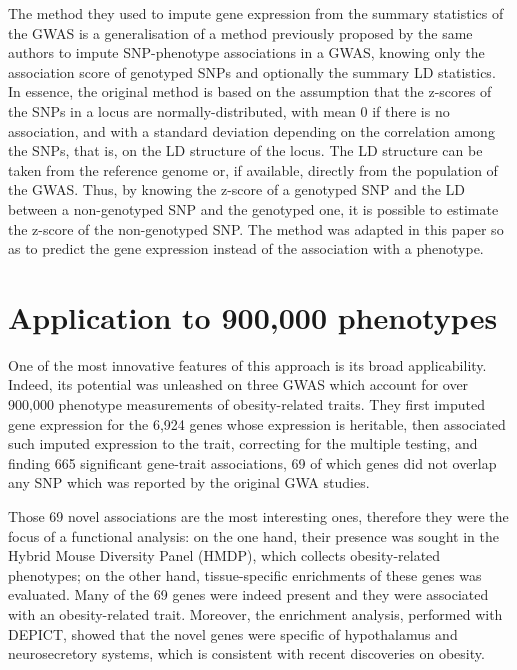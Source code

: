 \documentclass[../main.tex]{subfiles}
\begin{document}
The method they used to impute gene expression from the summary 
statistics of the GWAS is a generalisation of a method previously 
proposed by the same authors to impute SNP-phenotype associations in a 
GWAS, knowing only the association score of genotyped 
SNPs\cite{Pasaniuc2014} and optionally the summary LD statistics. In 
essence, the original method is based on the assumption that the 
z-scores of the SNPs in a locus are normally-distributed, with mean 0 if 
there is no association, and with a standard deviation depending on the 
correlation among the SNPs, that is, on the LD structure of the locus. 
The LD structure can be taken from the reference genome\cite{1000G} or, 
if available, directly from the population of the GWAS. Thus, by knowing 
the z-score of a genotyped SNP and the LD between a non-genotyped SNP 
and the genotyped one, it is possible to estimate the z-score of the 
non-genotyped SNP. The method was adapted in this paper so as to predict 
the gene expression instead of the association with a phenotype.

\section{Application to 900,000 phenotypes}

One of the most innovative features of this approach is its broad 
applicability. Indeed, its potential was unleashed on three GWAS which 
account for over 900,000 phenotype measurements of obesity-related 
traits. They first 
imputed gene expression for the 6,924 genes whose expression is 
heritable, then associated such imputed expression to the trait, 
correcting for the multiple testing, and finding 665 significant 
gene-trait associations, 69 of which genes did not overlap any SNP which 
was reported by the original GWA studies.



Those 69 novel associations are the most interesting ones, therefore 
they were the focus of a functional analysis: on the one hand, their 
presence was sought in the Hybrid Mouse Diversity Panel (HMDP), which 
collects obesity-related phenotypes; on the other hand, tissue-specific 
enrichments of these genes was evaluated. Many of the 69 genes were 
indeed present and they were associated with an obesity-related trait. 
Moreover, the enrichment analysis, performed with DEPICT, showed that 
the novel genes were specific of hypothalamus and neurosecretory 
systems, which is consistent with recent discoveries on 
obesity.
\end{document}
